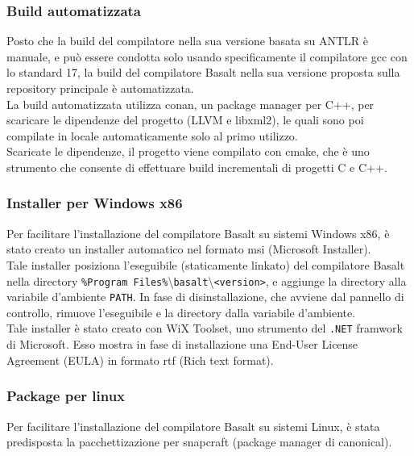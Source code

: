 \subsubsection{Build automatizzata}
Posto che la build del compilatore nella sua versione basata su ANTLR è manuale, e può essere condotta 
solo usando specificamente il compilatore gcc con lo standard 17, la build del compilatore Basalt
nella sua versione proposta sulla repository principale è automatizzata. \\

La build automatizzata utilizza conan, un package manager per C++, 
per scaricare le dipendenze del progetto (LLVM e libxml2), le quali sono 
poi compilate in locale automaticamente solo al primo utilizzo. \\

Scaricate le dipendenze, il progetto viene compilato con cmake, che è uno strumento 
che consente di effettuare build incrementali di progetti C e C++. \\

\subsubsection{Installer per Windows x86}
Per facilitare l'installazione del compilatore Basalt su sistemi Windows x86, è stato creato un installer
automatico nel formato msi (Microsoft Installer). \\

Tale installer posiziona l'eseguibile (staticamente linkato) del compilatore Basalt nella directory 
\texttt{\%Program Files\%}\textbackslash\texttt{basalt}\textbackslash\texttt{<version>}, 
e aggiunge la directory alla variabile d'ambiente \texttt{PATH}. In fase di disinstallazione, 
che avviene dal pannello di controllo, rimuove l'eseguibile e la directory dalla variabile d'ambiente. \\

Tale installer è stato creato con WiX Toolset, uno strumento del \texttt{.NET} framwork di Microsoft.
Esso mostra in fase di installazione una End-User License Agreement (EULA) in formato rtf (Rich text format). \\

\subsubsection{Package per linux}
Per facilitare l'installazione del compilatore Basalt su sistemi Linux, è stata predisposta 
la pacchettizazione per snapcraft (package manager di canonical). \\

